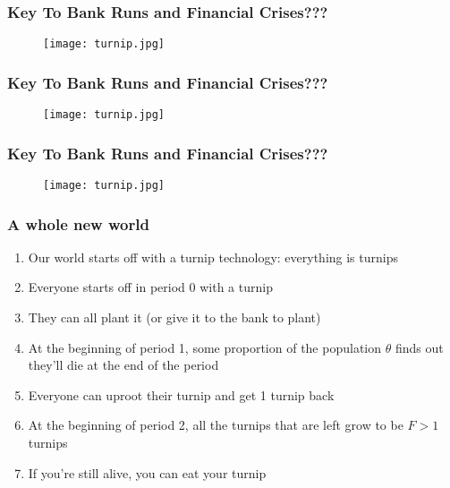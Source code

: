 \documentclass{beamer}
\begin{document}
\begin{frame}
\frametitle{Key To Bank Runs and Financial Crises???}
\begin{figure}
\centering
\texttt{[image: turnip.jpg]}
\end{figure}
\end{frame}

\begin{frame}
\frametitle{Key To Bank Runs and Financial Crises???}
\begin{figure}
\centering
\texttt{[image: turnip.jpg]}
\end{figure}
\end{frame}

\begin{frame}
\frametitle{Key To Bank Runs and Financial Crises???}
\begin{figure}
\centering
\texttt{[image: turnip.jpg]}
\end{figure}
\end{frame}

\begin{frame}
\frametitle{A whole new world}
\begin{enumerate}
\item<1-> Our world starts off with a turnip technology: everything is turnips
\bigskip
\item<2-> Everyone starts off in period 0 with a turnip
\bigskip
\item<3-> They can all plant it (or give it to the bank to plant)
\bigskip
\item<4-> At the beginning of period 1, some proportion of the population $\theta$ finds out they'll die at the end of the period
\bigskip
\item<5-> Everyone can uproot their turnip and get 1 turnip back
\bigskip
\item<6-> At the beginning of period 2, all the turnips that are left grow to be $F>1$ turnips
\bigskip
\item<7-> If you're still alive, you can eat your turnip
\end{enumerate}
\end{frame}
\end{document}
